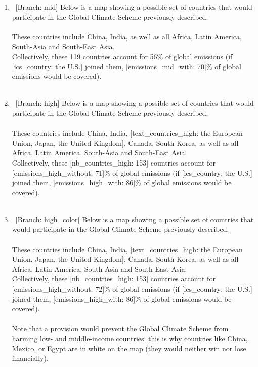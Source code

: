 \documentclass[12pt,english]{article}
\begin{document}
\begin{bibunit}
\begin{enumerate}[resume]
\item ~[Branch: mid] \label{q:gcs_mid} Below is a map showing a possible set of countries that would participate in the Global Climate Scheme previously described.\\
~\\
These countries include China, India, as well as all Africa, Latin America, South-Asia and South-East Asia.\\
Collectively, these 119 countries account for 56\% of global emissions (if [ics\_country: the U.S.] joined them, [emissions\_mid\_with: 70]\% of global emissions would be covered).\\
~\\ 

\item ~[Branch: high]  \label{q:gcs_high} Below is a map showing a possible set of countries that would participate in the Global Climate Scheme previously described.\\
~\\
These countries include China, India, [text\_countries\_high: the European Union, Japan, the United Kingdom], Canada, South Korea, as well as all Africa, Latin America, South-Asia and South-East Asia.~\\
Collectively, these [nb\_countries\_high: 153] countries account for [emissions\_high\_without: 71]\% of global emissions (if [ics\_country: the U.S.] joined them, [emissions\_high\_with: 86]\% of global emissions would be covered).\\
~\\ 

\item ~[Branch: high\_color]  \label{q:gcs_high_color} Below is a map showing a possible set of countries that would participate in the Global Climate Scheme previously described.\\
~\\
These countries include China, India, [text\_countries\_high: the European Union, Japan, the United Kingdom], Canada, South Korea, as well as all Africa, Latin America, South-Asia and South-East Asia. \\
Collectively, these [nb\_countries\_high: 153] countries account for [emissions\_high\_without: 72]\% of global emissions (if [ics\_country: the U.S.] joined them, [emissions\_high\_with: 86]\% of global emissions would be covered).\\\\Note that a provision would prevent the Global Climate Scheme from harming low- and middle-income countries: this is why countries like China, Mexico, or Egypt are in white on the map (they would neither win nor lose financially).\\



\end{enumerate}
\end{bibunit}
\end{document}
